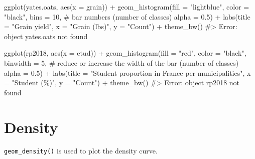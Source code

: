 \documentclass[
  letterpaper,
  DIV=11,
  numbers=noendperiod]{scrreprt}
\newenvironment{Shaded}{\begin{snugshade}}{\end{snugshade}}
\newcommand{\AttributeTok}[1]{\textcolor[rgb]{0.40,0.45,0.13}{#1}}
\newcommand{\CommentTok}[1]{\textcolor[rgb]{0.37,0.37,0.37}{#1}}
\newcommand{\DecValTok}[1]{\textcolor[rgb]{0.68,0.00,0.00}{#1}}
\newcommand{\FloatTok}[1]{\textcolor[rgb]{0.68,0.00,0.00}{#1}}
\newcommand{\FunctionTok}[1]{\textcolor[rgb]{0.28,0.35,0.67}{#1}}
\newcommand{\NormalTok}[1]{\textcolor[rgb]{0.00,0.23,0.31}{#1}}
\newcommand{\SpecialCharTok}[1]{\textcolor[rgb]{0.37,0.37,0.37}{#1}}
\newcommand{\StringTok}[1]{\textcolor[rgb]{0.13,0.47,0.30}{#1}}
\begin{document}
\begin{Shaded}
\begin{Highlighting}[]


\FunctionTok{ggplot}\NormalTok{(yates.oats, }\FunctionTok{aes}\NormalTok{(}\AttributeTok{x =}\NormalTok{ grain)) }\SpecialCharTok{+}
  \FunctionTok{geom\_histogram}\NormalTok{(}\AttributeTok{fill =} \StringTok{"lightblue"}\NormalTok{,}
                 \AttributeTok{color =} \StringTok{"black"}\NormalTok{,}
                 \AttributeTok{bins =} \DecValTok{10}\NormalTok{, }\CommentTok{\# bar numbers (number of classes)}
                 \AttributeTok{alpha =} \FloatTok{0.5}\NormalTok{) }\SpecialCharTok{+} 
  \FunctionTok{labs}\NormalTok{(}\AttributeTok{title =} \StringTok{"Grain yield"}\NormalTok{, }
       \AttributeTok{x =} \StringTok{"Grain (lbs)"}\NormalTok{, }
       \AttributeTok{y =} \StringTok{"Count"}\NormalTok{) }\SpecialCharTok{+} 
  \FunctionTok{theme\_bw}\NormalTok{() }
\CommentTok{\#\textgreater{} Error: object \textquotesingle{}yates.oats\textquotesingle{} not found}


\FunctionTok{ggplot}\NormalTok{(rp2018, }\FunctionTok{aes}\NormalTok{(}\AttributeTok{x =}\NormalTok{ etud)) }\SpecialCharTok{+}
  \FunctionTok{geom\_histogram}\NormalTok{(}\AttributeTok{fill =} \StringTok{"red"}\NormalTok{,}
                 \AttributeTok{color =} \StringTok{"black"}\NormalTok{,}
                 \AttributeTok{binwidth =} \DecValTok{5}\NormalTok{, }\CommentTok{\# reduce or increase the width of the bar (number of classes)}
                 \AttributeTok{alpha =} \FloatTok{0.5}\NormalTok{) }\SpecialCharTok{+} 
  \FunctionTok{labs}\NormalTok{(}\AttributeTok{title =} \StringTok{"Student proportion in France per municipalities"}\NormalTok{, }
       \AttributeTok{x =} \StringTok{"Student (\%)"}\NormalTok{, }
       \AttributeTok{y =} \StringTok{"Count"}\NormalTok{) }\SpecialCharTok{+} 
  \FunctionTok{theme\_bw}\NormalTok{() }
\CommentTok{\#\textgreater{} Error: object \textquotesingle{}rp2018\textquotesingle{} not found}
\end{Highlighting}
\end{Shaded}

\section{Density}\label{density}

\texttt{geom\_density()} is used to plot the density curve.
\end{document}
